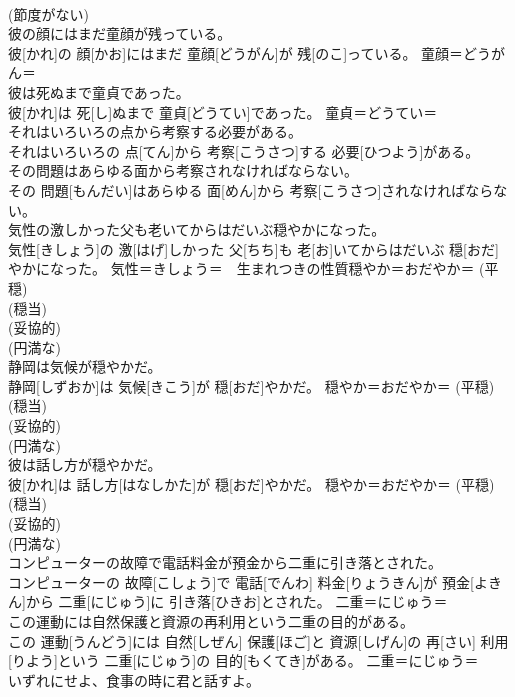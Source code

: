 \documentclass[8pt]{extreport}
\begin{document}
\begin{CJK}{UTF8}{min}
{\\	(節度がない) 
\\	彼の顔にはまだ童顔が残っている。	
\\	彼[かれ]の 顔[かお]にはまだ 童顔[どうがん]が 残[のこ]っている。	童顔＝どうがん＝ 
\\	彼は死ぬまで童貞であった。	
\\	彼[かれ]は 死[し]ぬまで 童貞[どうてい]であった。	童貞＝どうてい＝ 
\\	それはいろいろの点から考察する必要がある。	
\\	それはいろいろの 点[てん]から 考察[こうさつ]する 必要[ひつよう]がある。	
\\	その問題はあらゆる面から考察されなければならない。	
\\	その 問題[もんだい]はあらゆる 面[めん]から 考察[こうさつ]されなければならない。	
\\	気性の激しかった父も老いてからはだいぶ穏やかになった。	
\\	気性[きしょう]の 激[はげ]しかった 父[ちち]も 老[お]いてからはだいぶ 穏[おだ]やかになった。	気性＝きしょう＝　生まれつきの性質穏やか＝おだやか＝ (平穏) 
\\	(穏当) 
\\	(妥協的) 
\\	(円満な) 
\\	静岡は気候が穏やかだ。	
\\	静岡[しずおか]は 気候[きこう]が 穏[おだ]やかだ。	穏やか＝おだやか＝ (平穏) 
\\	(穏当) 
\\	(妥協的) 
\\	(円満な) 
\\	彼は話し方が穏やかだ。	
\\	彼[かれ]は 話し方[はなしかた]が 穏[おだ]やかだ。	穏やか＝おだやか＝ (平穏) 
\\	(穏当) 
\\	(妥協的) 
\\	(円満な) 
\\	コンピューターの故障で電話料金が預金から二重に引き落とされた。	
\\	コンピューターの 故障[こしょう]で 電話[でんわ] 料金[りょうきん]が 預金[よきん]から 二重[にじゅう]に 引き落[ひきお]とされた。	二重＝にじゅう＝ 
\\	この運動には自然保護と資源の再利用という二重の目的がある。	
\\	この 運動[うんどう]には 自然[しぜん] 保護[ほご]と 資源[しげん]の 再[さい] 利用[りよう]という 二重[にじゅう]の 目的[もくてき]がある。	二重＝にじゅう＝ 
\\	いずれにせよ、食事の時に君と話すよ。	
}
\end{CJK}
\end{document}
